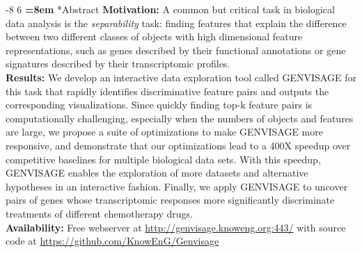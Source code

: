 \documentclass[10pt,letterpaper]{article}
\makeatletter
\renewcommand\section{\@startsection{section}{1}{\z@}%
                       {-8\p@ \@plus -4\p@ \@minus -4\p@}%
                       {6\p@ \@plus 4\p@ \@minus 4\p@}%
                       {\normalfont\large\bfseries\boldmath
                        \rightskip=\z@ \@plus 8em\pretolerance=10000 }}
\newcommand{\genviz}{{\sc G{\small ENVISAGE}}\xspace}
\makeatother
\begin{document}
\section*{Abstract}
\textbf{Motivation:} A common but critical task in biological data analysis is the {\em separability} task: finding features that explain the difference between two different classes of objects with high dimensional feature representations, such as genes described by their functional annotations or gene signatures described by their transcriptomic profiles.\\
\textbf{Results:} We develop an interactive data exploration tool called \genviz for this task that rapidly identifies discriminative feature pairs and outputs the corresponding visualizations. Since quickly finding top-k feature pairs is computationally challenging, especially when the numbers of objects and features are large, we propose a suite of optimizations to make \genviz more responsive, and demonstrate that our optimizations lead to a 400X speedup over competitive baselines for multiple biological data sets. With this speedup, \genviz enables the exploration of more datasets and alternative hypotheses in an interactive fashion. Finally, we apply \genviz to uncover pairs of genes whose transcriptomic responses more significantly discriminate treatments of different chemotherapy drugs.\\
\textbf{Availability:} Free webserver at \url{http://genvisage.knoweng.org:443/} with source code at \url{https://github.com/KnowEnG/Genvisage} \\

\linenumbers



\end{document}
